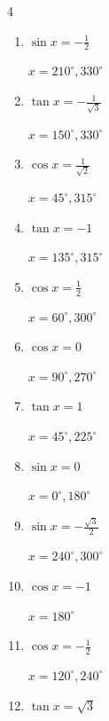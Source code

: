 \begin{multicols}{4}
\begin{enumerate}
        $\displaystyle x = 210^{\circ} , 330^{\circ}$

  \item $\displaystyle \sin{x}  = -\frac{1}{2}$

        $\displaystyle x = 210^{\circ} , 330^{\circ}$

  \item $\displaystyle \tan{x}  = -\frac{1}{\sqrt{3}}$

        $\displaystyle x = 150^{\circ} , 330^{\circ}$

  \item $\displaystyle \cos{x}  = \frac{1}{\sqrt{2}}$

        $\displaystyle x = 45^{\circ} , 315^{\circ}$

  \item $\displaystyle \tan{x}  = -1$

        $\displaystyle x = 135^{\circ} , 315^{\circ}$

  \item $\displaystyle \cos{x}  = \frac{1}{2}$

        $\displaystyle x = 60^{\circ} , 300^{\circ}$

  \item $\displaystyle \cos{x}  = 0$

        $\displaystyle x = 90^{\circ} , 270^{\circ}$

  \item $\displaystyle \tan{x}  = 1$

        $\displaystyle x = 45^{\circ} , 225^{\circ}$

  \item $\displaystyle \sin{x}  = 0$

        $\displaystyle x = 0^{\circ} , 180^{\circ}$

\columnbreak %

  \item $\displaystyle \sin{x}  = -\frac{\sqrt{3}}{2}$

        $\displaystyle x = 240^{\circ} , 300^{\circ}$

  \item $\displaystyle \cos{x}  = -1$

        $\displaystyle x = 180^{\circ}$

  \item $\displaystyle \cos{x}  = -\frac{1}{2}$

        $\displaystyle x = 120^{\circ} , 240^{\circ}$

  \item $\displaystyle \tan{x}  = \sqrt{3}$


\end{enumerate}
\end{multicols}
